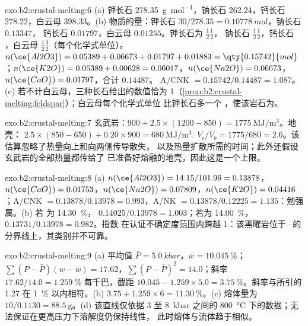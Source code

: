 \begin{solution}{exo:b2:crustal-melting:6}
(a) 钾长石 \qty{278.35}{\gram\per\mole}，钠长石 262.24，钙长石 278.22，白云母
398.33。(b) 物质的量：钾长石 $30/278.35 = \qty{0.10778}{mol}$，钠长石 $0.13347$，
钙长石 $0.01797$，白云母 $0.01255$。钾长石为 $\tfrac12$$\tfrac12$，
钠长石 $\tfrac12$$\tfrac12$，钙长石 ，白云母
$\tfrac12$$\tfrac32$（每个化学式单位）。$n(\ce{Al2O3}) = 0.05389 +
0.06673 + 0.01797 + 0.01883 = \qty{0.15742}{mol}$；$n(\ce{K2O}) = 0.05389 + 0.00628 =
0.06017$，$n(\ce{Na2O}) = 0.06673$，$n(\ce{CaO}) = 0.01797$，合计 $0.14487$。
A/CNK $= 0.15742/0.14487 = 1.087$。(c) 若不计白云母，三种长石给出的数值恰为
1（\cref{prop:b2:crustal-melting:feldspar}）；白云母每个化学式单位
比钾长石多一个 ，使该岩石为。
\end{solution}

\begin{solution}{exo:b2:crustal-melting:7}
玄武岩：$900 + 2.5\times(1200 - 850) = \qty{1775}{\mega\joule\per\cubic\metre}$。地壳：
$2.5\times(850 - 650) + 0.20\times900 = \qty{680}{\mega\joule\per\cubic\metre}$.
$V_c/V_b = 1775/680 = 2.6$。该估算忽略了热量向上和向两侧传导散失，
以及热量扩散所需的时间；此外还假设玄武岩的全部热量都传给了
已准备好熔融的地壳，因此这是一个上限。
\end{solution}

\begin{solution}{exo:b2:crustal-melting:8}
(a) $n(\ce{Al2O3}) = 14.15/101.96 = 0.13878$，$n(\ce{CaO}) = 0.01753$，$n(\ce{Na2O}) =
0.07809$，$n(\ce{K2O}) = 0.04416$；A/CNK $= 0.13878/0.13978 = 0.993$，A/NK $=
0.13878/0.12225 = 1.135$：勉强属。(b) 若  为 \qty{14.30}{\percent}，
$0.14025/0.13978 = 1.003$；若为 \qty{14.00}{\percent}，$0.13731/0.13978 = 0.982$。指数
在认证不确定度范围内跨越 1：该黑曜岩位于
–的分界线上，其类别并不可靠。
\end{solution}

\begin{solution}{exo:b2:crustal-melting:9}
(a) 平均值 $\bar P = \qty{5.0}{kbar}$，$\bar w = \qty{10.045}{\percent}$；
$\sum(P - \bar P)(w - \bar w) = 17.62$，$\sum(P - \bar P)^2 = 14.0$；斜率
$17.62/14.0 = \qty{1.259}{\percent}$ 每千巴，截距 $10.045 - 1.259\times5.0 =
\qty{3.75}{\percent}$。斜率与所引的 1.27 在
\qty{1}{\percent} 以内相符。(b) $3.75 + 1.259\times6 = \qty{11.30}{\percent}$。(c) 熔体量为 $10/0.1130 =
\qty{88.5}{\gram}$。(d) 该直线仅依据 3 至 \qty{8}{kbar} 之间的
\qty{800}{\celsius} 下的数据；无法保证在更高压力下溶解度仍保持线性，
此时熔体与流体趋于相似。
\end{solution}

